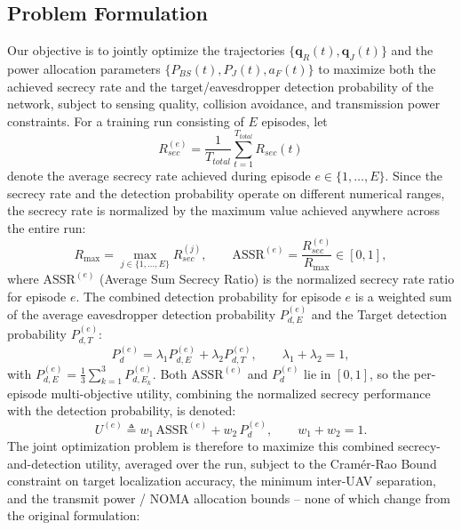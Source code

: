 \documentclass[journal,onecolumn]{IEEEtran}
\begin{document}
\subsection{Problem Formulation}
Our objective is to jointly optimize the trajectories $\{\mathbf{q}_R(t), \mathbf{q}_J(t)\}$ and the power allocation parameters $\{P_{BS}(t), P_J(t), a_F(t)\}$ to maximize both the achieved secrecy rate and the target/eavesdropper detection probability of the network, subject to sensing quality, collision avoidance, and transmission power constraints. For a training run consisting of $E$ episodes, let
\begin{equation}
    R_{sec}^{(e)} = \frac{1}{T_{total}} \sum_{t=1}^{T_{total}} R_{sec}(t)
\end{equation}
denote the average secrecy rate achieved during episode $e \in \{1, \dots, E\}$. Since the secrecy rate and the detection probability operate on different numerical ranges, the secrecy rate is normalized by the maximum value achieved anywhere across the entire run:
\begin{equation}
    R_{\max} = \max_{j \in \{1, \dots, E\}} R_{sec}^{(j)}, \qquad
    \text{ASSR}^{(e)} = \frac{R_{sec}^{(e)}}{R_{\max}} \in [0, 1],
\end{equation}
where $\text{ASSR}^{(e)}$ (Average Sum Secrecy Ratio) is the normalized secrecy rate ratio for episode $e$. The combined detection probability for episode $e$ is a weighted sum of the average eavesdropper detection probability $P_{d,E}^{(e)}$ and the Target detection probability $P_{d,T}^{(e)}$:
\begin{equation}
    P_d^{(e)} = \lambda_1 P_{d,E}^{(e)} + \lambda_2 P_{d,T}^{(e)}, \qquad \lambda_1 + \lambda_2 = 1,
\end{equation}
with $P_{d,E}^{(e)} = \frac{1}{3}\sum_{k=1}^3 P_{d,E_k}^{(e)}$. Both $\text{ASSR}^{(e)}$ and $P_d^{(e)}$ lie in $[0,1]$, so the per-episode multi-objective utility, combining the normalized secrecy performance with the detection probability, is denoted:
\begin{equation}
    U^{(e)} \triangleq w_1 \,\text{ASSR}^{(e)} + w_2 \,P_d^{(e)}, \qquad w_1 + w_2 = 1.
\end{equation}
The joint optimization problem is therefore to maximize this combined secrecy-and-detection utility, averaged over the run, subject to the Cram\'{e}r-Rao Bound constraint on target localization accuracy, the minimum inter-UAV separation, and the transmit power / NOMA allocation bounds -- none of which change from the original formulation:
\end{document}
